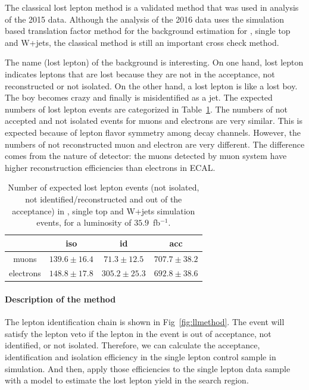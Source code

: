 The classical lost lepton method is a validated method that was used in analysis of the 2015 data\cite{PhysRevD.96.012004}. Although the analysis of the 2016 data uses the simulation based translation factor method for the background estimation for \ttbar, single top and W+jets, the classical method is still an important cross check method. 

The name (lost lepton) of the background is interesting. On one hand, lost lepton indicates leptons that are lost because they are not in the acceptance, not reconstructed or not isolated. On the other hand, a lost lepton is like a lost boy. The boy becomes crazy and finally is misidentified as a jet. The expected numbers of lost lepton events are categorized in Table~\ref{tab:nexpLL}. The numbers of not accepted and not isolated events for muons and electrons are very similar. This is expected because of lepton flavor symmetry among \ttbar decay channels. However, the numbers of not reconstructed muon and electron are very different. The difference comes from the nature of detector: the muons detected by muon system have higher reconstruction efficiencies than electrons in ECAL. 

\begin{table}[htbp]
\fontsize{10 pt}{1.2 em}
\caption{Number of expected lost lepton events (not isolated, not identified/reconstructed and out of the acceptance) in \ttbar, single top and W+jets simulation events, for a luminosity of $35.9$~fb$^{-1}$.} 
\begin{center}
\begin{tabular}{|c|c|c|c|}
\hline
          & iso  & id   & acc \\
\hline
muons     & $139.6\pm16.4$ & $71.3\pm12.5$ & $707.7\pm38.2$ \\
electrons & $148.8\pm17.8$ & $305.2\pm25.3$ & $692.8\pm38.6$ \\
\hline\end{tabular}
\end{center}
\label{tab:nexpLL}
\end{table}

\paragraph{Description of the method}

The lepton identification chain is shown in Fig~\ref{fig:llmethod}. The event will satisfy the lepton veto if the lepton in the event is out of acceptance, not identified, or not isolated. Therefore, we can calculate the acceptance, identification and isolation efficiency in the single lepton control sample in simulation. And then, apply those efficiencies to the single lepton data sample with a model to estimate the lost lepton yield in the search region. 

